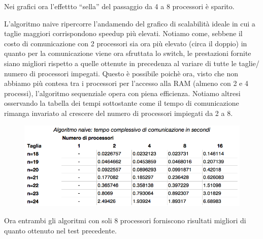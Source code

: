 \documentclass[12pt,a4paper,oneside,openright]{article}
\begin{document}
Nei grafici ora l'effettto ``sella'' del passaggio da 4 a 8 processori è sparito. 

L'algoritmo naive ripercorre l'andamendo del grafico di scalabilità ideale in cui a taglie maggiori corrispondono speedup più elevati.
Notiamo come, sebbene il costo di comunicazione con 2 processori sia ora più elevato (circa il doppio) in quanto per la comunicazione viene ora sfruttata lo switch, le prestazioni fornite siano migliori rispetto a quelle ottenute in precedenza al variare di tutte le taglie/ numero di processori impegati.
Questo è possibile poichè ora, visto che non abbiamo più contesa tra i processori per l'accesso alla RAM (almeno con 2 e 4 processi), l'algoritmo sequenziale opera con piena efficienza.
Notiamo altresi osservando la tabella dei tempi sottostante come il tempo di comunicazione rimanga invariato al crescere del numero di processori impiegati da 2 a 8.
\begin{figure}[H] 
  \centering
      \includegraphics[width=\textwidth]{immagini/algoritmo_normale_tempo_comunicazione_con_rete}
\end{figure}

Ora entrambi gli algoritmi con soli 8 processori forniscono risultati migliori di quanto ottenuto nel test precedente.
\end{document}
